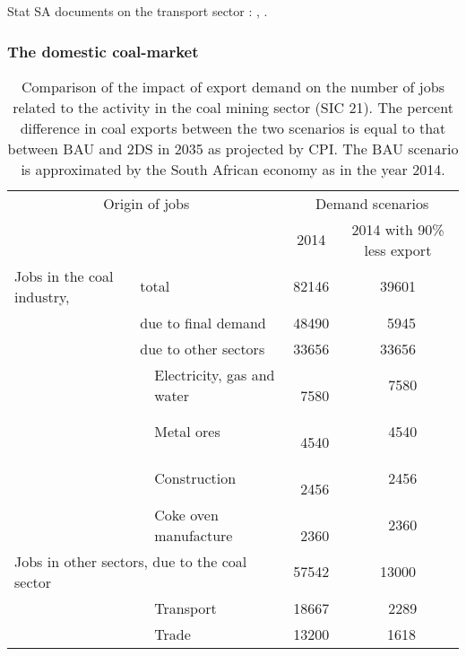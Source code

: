\documentclass[12pt,english]{article}
\begin{document}

Stat SA documents on the transport sector : \citep{LandTransp2014}, \citep{P7000_2013}.

\subsubsection{The domestic coal-market}

\begin{table}[ht]
	\centering
	\begin{tabular}{lp{20pt}lcc}
		\multicolumn{3}{c}{Origin of jobs} &\multicolumn{2}{c}{Demand scenarios}   \\ 
		\multicolumn{3}{c}{} & 2014 & 2014 with 90\% less export \\ 
		\midrule
		Jobs in the coal industry,	& \multicolumn{2}{l}{total}  & 82146 & 39601 \\ 
		& \multicolumn{2}{l}{due to final demand}  & 48490 & \, 5945 \\ 
		
		& \multicolumn{2}{l}{due to other sectors}  & 33656 & 33656 \\ 
		& 	 & Electricity, gas and water & \,\ 7580  & \,\ 7580 \\ 
		&    & Metal ores& \,\ 4540  & \,\ 4540 \\ 
		&    & Construction& \,\ 2456  & \,\ 2456  \\ 														
		&    & Coke oven manufacture& \,\ 2360  & \,\ 2360   \\ 
		\midrule
		\multicolumn{3}{l}{Jobs in other sectors, due to the coal sector}  & 57542 &  13000 \\ 
		& 						 & Transport & 18667 &  \ \,2289 \\ 
		& 						 & Trade & 13200 &  \  1618 \\ 
		\bottomrule
	\end{tabular}
	\caption{\label{coalExport_BAUvs2DS_2035}Comparison of the impact of export demand on the number of jobs related to the activity in the coal mining sector (SIC 21). The percent difference in coal exports between the two scenarios is equal to that between BAU and 2DS in 2035 as projected by CPI. The BAU scenario is approximated by the South African economy as in the year 2014.}
\end{table}
\end{document}
